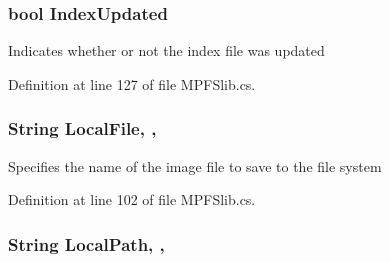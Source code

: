 \hypertarget{class_microchip_1_1_m_p_f_s_builder_a944fdb01a06b9ef65786b8de57dcd97a}{}
\subsubsection[{Index\+Updated}]{\setlength{\rightskip}{0pt plus 5cm}bool Index\+Updated\hspace{0.3cm}{\ttfamily [get]}}\label{class_microchip_1_1_m_p_f_s_builder_a944fdb01a06b9ef65786b8de57dcd97a}


Indicates whether or not the index file was updated 



Definition at line 127 of file M\+P\+F\+Slib.\+cs.

\hypertarget{class_microchip_1_1_m_p_f_s_builder_a26bf3056ff1696480b7019462a2b408d}{}
\subsubsection[{Local\+File}]{\setlength{\rightskip}{0pt plus 5cm}String Local\+File\hspace{0.3cm}{\ttfamily [get]}, {\ttfamily [set]}, {\ttfamily [protected]}}\label{class_microchip_1_1_m_p_f_s_builder_a26bf3056ff1696480b7019462a2b408d}


Specifies the name of the image file to save to the file system 



Definition at line 102 of file M\+P\+F\+Slib.\+cs.

\hypertarget{class_microchip_1_1_m_p_f_s_builder_aa396fc601d5eda5056c98ece9d06b262}{}
\subsubsection[{Local\+Path}]{\setlength{\rightskip}{0pt plus 5cm}String Local\+Path\hspace{0.3cm}{\ttfamily [get]}, {\ttfamily [set]}, {\ttfamily [protected]}}\label{class_microchip_1_1_m_p_f_s_builder_aa396fc601d5eda5056c98ece9d06b262}


